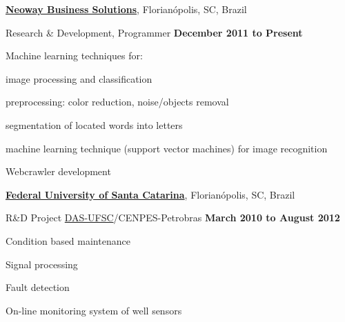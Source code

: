 \documentclass[10pt]{article}
\renewcommand\textit[1]{#1}
\newcommand{\halfblankline}{\quad\vspace{-0.5\baselineskip}\pagebreak[3]}
\begin{document}
\href{http://www.neoway.com.br/}{\textbf{Neoway Business Solutions}},
Florianópolis, SC, Brazil
\begin{outerlist}

\item[] \textit{Research \& Development, Programmer}%
    \hfill \textbf{December 2011 to Present}
    \begin{innerlist}
    \item Machine learning techniques for:
        \begin{innerlist}
            \item image processing and classification
            \begin{innerlist}
                \item preprocessing: color reduction, noise/objects removal
                \item segmentation of located words into letters 
                \item machine learning technique (support vector machines) for image
                    recognition 
            \end{innerlist}
        \item Webcrawler development
        \end{innerlist}
    \end{innerlist}

\end{outerlist}
\halfblankline

\href{http://www.ufsc.br}{\textbf{Federal University of Santa Catarina}},
Florianópolis, SC, Brazil
\begin{outerlist}
    
\item[] \textit{R\&D Project \href{http://www.das.ufsc.br}{DAS-UFSC}/CENPES-Petrobras}
    \hfill \textbf{March 2010 to August 2012}
    \begin{innerlist}
    \item Condition based maintenance
    \item Signal processing
    \item Fault detection
    \item On-line monitoring system of well sensors
    \end{innerlist}
\end{outerlist}
\halfblankline
\end{document}
